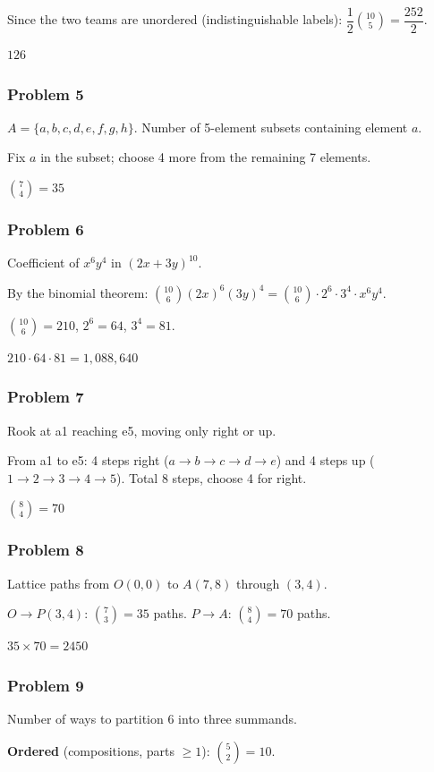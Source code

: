 Since the two teams are unordered (indistinguishable labels):
$\dfrac{1}{2}\binom{10}{5} = \dfrac{252}{2}$.

$\boxed{126}$

\subsubsection*{Problem 5}
$A=\{a,b,c,d,e,f,g,h\}$. Number of 5-element subsets containing element $a$.

Fix $a$ in the subset; choose 4 more from the remaining 7 elements.

$\boxed{\binom{7}{4} = 35}$

\subsubsection*{Problem 6}
Coefficient of $x^6 y^4$ in $(2x+3y)^{10}$.

By the binomial theorem: $\binom{10}{6}(2x)^6(3y)^4 = \binom{10}{6}\cdot 2^6\cdot 3^4\cdot x^6 y^4$.

$\binom{10}{6}=210$, $2^6=64$, $3^4=81$.

$\boxed{210\cdot 64\cdot 81 = 1{,}088{,}640}$

\subsubsection*{Problem 7}
Rook at a1 reaching e5, moving only right or up.

From a1 to e5: 4 steps right ($a\to b\to c\to d\to e$) and 4 steps up ($1\to2\to3\to4\to5$). Total 8 steps, choose 4 for right.

$\boxed{\binom{8}{4} = 70}$

\subsubsection*{Problem 8}
Lattice paths from $O(0,0)$ to $A(7,8)$ through $(3,4)$.

$O\to P(3,4)$: $\binom{7}{3}=35$ paths. $P\to A$: $\binom{8}{4}=70$ paths.

$\boxed{35\times 70 = 2450}$

\subsubsection*{Problem 9}
Number of ways to partition 6 into three summands.

\textbf{Ordered} (compositions, parts $\ge 1$): $\binom{5}{2}=\boxed{10}$.

